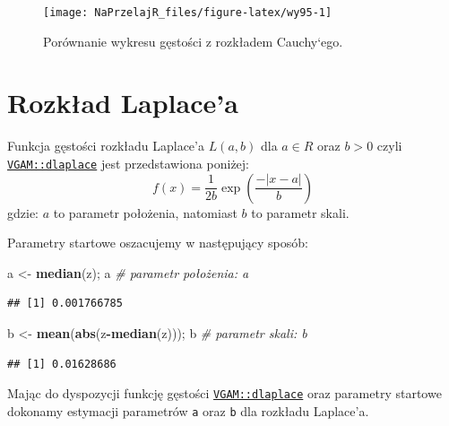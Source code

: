 \documentclass[polish,]{book}
\newenvironment{Shaded}{\begin{snugshade}}{\end{snugshade}}
\newcommand{\CommentTok}[1]{\textcolor[rgb]{0.56,0.35,0.01}{\textit{#1}}}
\newcommand{\KeywordTok}[1]{\textcolor[rgb]{0.13,0.29,0.53}{\textbf{#1}}}
\newcommand{\NormalTok}[1]{#1}
\newcommand{\OperatorTok}[1]{\textcolor[rgb]{0.81,0.36,0.00}{\textbf{#1}}}
\newcommand{\StringTok}[1]{\textcolor[rgb]{0.31,0.60,0.02}{#1}}
\begin{document}
\begin{figure}[h]

{\centering \texttt{[image: NaPrzelajR\_files/figure-latex/wy95-1]} 

}

\caption{Porównanie wykresu gęstości z rozkładem Cauchy`ego.}\label{fig:wy95}
\end{figure}

\hypertarget{part_9.5}{%
\section{Rozkład Laplace'a}\label{part_9.5}}

Funkcja gęstości rozkładu Laplace'a \(L(a, b)\) dla \(a \in R\) oraz \(b > 0\) czyli \href{https://rdrr.io/cran/VGAM/man/laplaceUC.html}{\texttt{VGAM::dlaplace}} jest przedstawiona poniżej:
\begin{equation}
f(x)=\frac{1}{2b}\exp\left(\frac{-|x-a|}{b}\right)
\label{eq:wz922}
\end{equation}
gdzie: \(a\) to parametr położenia, natomiast \(b\) to parametr skali.

Parametry startowe oszacujemy w następujący sposób:

\begin{Shaded}
\begin{Highlighting}[]
\NormalTok{a <-}\StringTok{ }\KeywordTok{median}\NormalTok{(z); a     }\CommentTok{# parametr położenia: a}
\end{Highlighting}
\end{Shaded}

\begin{verbatim}
## [1] 0.001766785
\end{verbatim}

\begin{Shaded}
\begin{Highlighting}[]
\NormalTok{b <-}\StringTok{ }\KeywordTok{mean}\NormalTok{(}\KeywordTok{abs}\NormalTok{(z}\OperatorTok{-}\KeywordTok{median}\NormalTok{(z))); b }\CommentTok{# parametr skali: b}
\end{Highlighting}
\end{Shaded}

\begin{verbatim}
## [1] 0.01628686
\end{verbatim}

Mając do dyspozycji funkcję gęstości \href{https://rdrr.io/cran/VGAM/man/laplaceUC.html}{\texttt{VGAM::dlaplace}} oraz parametry startowe dokonamy estymacji parametrów \texttt{a} oraz \texttt{b} dla rozkładu Laplace'a.
\end{document}
